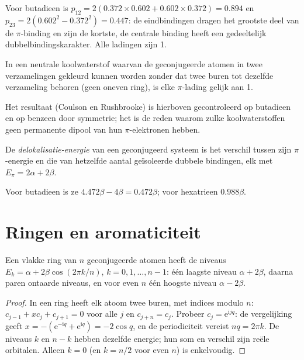 Voor butadieen is $p_{12} = 2(0.372 \times 0.602 + 0.602 \times 0.372) = 0.894$ en $p_{23} =
2(0.602^2 - 0.372^2) = 0.447$: de eindbindingen dragen het grootste deel van de $\pi$-binding en zijn
de kortste, de centrale binding heeft een gedeeltelijk dubbelbindingskarakter. Alle ladingen zijn
1.

\begin{proposition}\label{prop:b2:huckel:alternant}
In een neutrale koolwaterstof waarvan de geconjugeerde atomen in twee verzamelingen gekleurd kunnen worden
zonder dat twee buren tot dezelfde verzameling behoren (geen oneven ring), is elke $\pi$-lading gelijk aan 1.
\end{proposition}

\admitted

Het resultaat (Coulson en Rushbrooke) is hierboven gecontroleerd op butadieen en op benzeen door
symmetrie; het is de reden waarom zulke koolwaterstoffen geen permanente dipool van hun
$\pi$-elektronen hebben.

\begin{definition}\label{def:b2:huckel:delocalisation}
De \emph{delokalisatie-energie} van een geconjugeerd
systeem is het verschil tussen zijn $\pi$-energie en die van hetzelfde aantal
geïsoleerde dubbele bindingen, elk met $E_\pi = 2\alpha + 2\beta$.
\end{definition}

Voor butadieen is ze $4.472\beta - 4\beta = 0.472\beta$; voor hexatrieen $0.988\beta$.

\section{Ringen en aromaticiteit}

\begin{theorem}\label{thm:b2:huckel:ring}
Een vlakke ring van $n$ geconjugeerde atomen heeft de niveaus $E_k = \alpha + 2\beta\cos(2\pi k/n)$,
$k = 0, 1, \dots, n - 1$: één laagste niveau $\alpha + 2\beta$, daarna paren ontaarde
niveaus, en voor even $n$ één hoogste niveau $\alpha - 2\beta$.
\end{theorem}

\begin{proof}
In een ring heeft elk atoom twee buren, met indices modulo $n$:
$c_{j-1} + xc_j + c_{j+1} = 0$ voor alle $j$ en $c_{j+n} = c_j$. Probeer $c_j = \mathrm e^{\mathrm
i jq}$: de vergelijking geeft $x = -(\mathrm e^{-\mathrm iq} + \mathrm e^{\mathrm iq}) = -2\cos q$,
en de periodiciteit vereist $nq = 2\pi k$. De niveaus $k$ en $n - k$ hebben dezelfde
energie; hun som en verschil zijn reële orbitalen. Alleen $k = 0$ (en $k = n/2$ voor
even $n$) is enkelvoudig.
\end{proof}

